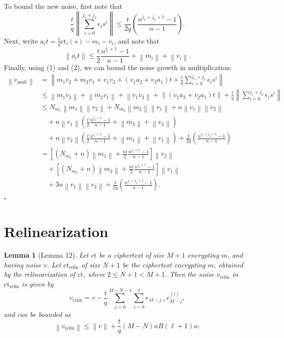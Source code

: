 \documentclass[11pt]{article}
\newtheorem{lemma}{Lemma}
\newcommand{\norm}[1]{\left\lVert #1\right\rVert}
\newcommand{\ct}{\mathrm{ct}}
\newcommand{\ctrelin}{\mathrm{ct}_{\mathrm{relin}}}
\newcommand{\vmult}{v_{\mathrm{mult}}}
\newcommand{\vrelin}{v_{\mathrm{relin}}}
\begin{document}
To bound the new noise, first note that
\begin{equation}
 \frac{t}{q}\left\lVert\sum_{i=0}^{j_1+j_2}\epsilon_i s^i\right\rVert
 \leq \frac{t}{2q}
       \left(\frac{n^{j_1+j_2+1}-1}{n-1}\right).
 \tag{1}
\end{equation}
Next, write $a_it=\frac{t}{q}\ct_i(s)-m_i-v_i$, and note that
\begin{equation}
 \norm{a_it}\leq
 \frac{t}{2}\frac{n^{j_i+1}-1}{n-1}
 +\norm{m_i}+\norm{v_i}.
 \tag{2}
\end{equation}
Finally, using (1) and (2), we can bound the noise growth in multiplication:
\begin{align*}
\norm{\vmult}
&=\left\lVert m_1v_2+m_2v_1+v_1v_2
 +(v_1a_2+v_2a_1)t
 +\frac{t}{q}\sum_{i=0}^{j_1+j_2}\epsilon_i s^i\right\rVert\\
&\leq \norm{m_1v_2}+\norm{m_2v_1}+\norm{v_1v_2}
 +\norm{(v_1a_2+v_2a_1)t}
 +\frac{t}{q}\left\lVert\sum_{i=0}^{j_1+j_2}\epsilon_i s^i\right\rVert\\
&\leq N_{m_1}\norm{m_1}\norm{v_2}
 +N_{m_2}\norm{m_2}\norm{v_1}
 +n\norm{v_1}\norm{v_2}\\
&\quad+n\norm{v_1}
 \left(\frac{t}{2}\frac{n^{j_2+1}-1}{n-1}
       +\norm{m_2}+\norm{v_2}\right)\\
&\quad+n\norm{v_2}
 \left(\frac{t}{2}\frac{n^{j_1+1}-1}{n-1}
       +\norm{m_1}+\norm{v_1}\right)
 +\frac{t}{2q}\left(\frac{n^{j_1+j_2+1}-1}{n-1}\right)\\
&=
 \left[(N_{m_1}+n)\norm{m_1}
       +\frac{nt}{2}\frac{n^{j_1+1}-1}{n-1}\right]\norm{v_2}\\
&\quad+
 \left[(N_{m_2}+n)\norm{m_2}
       +\frac{nt}{2}\frac{n^{j_2+1}-1}{n-1}\right]\norm{v_1}\\
&\quad+3n\norm{v_1}\norm{v_2}
 +\frac{t}{2q}\left(\frac{n^{j_1+j_2+1}-1}{n-1}\right).
\end{align*}
\hfill$\square$

\section*{Relinearization}

\begin{lemma}[Lemma 12]
Let $\ct$ be a ciphertext of size $M+1$ encrypting $m$, and having
noise $v$. Let $\ctrelin$ of size $N+1$ be the ciphertext encrypting
$m$, obtained by the relinearization of $\ct$, where
$2\leq N+1<M+1$. Then the noise $\vrelin$ in $\ctrelin$ is given by
\[
 \vrelin
 =v-\frac{t}{q}
   \sum_{j=0}^{M-N-1}\sum_{i=0}^{\ell}
   e_{M-j,i}\,c_{M-j}^{(i)},
\]
and can be bounded as
\[
 \norm{\vrelin}\leq \norm{v}
       +\frac{t}{q}(M-N)nB(\ell+1)w.
\]
\end{lemma}
\end{document}
